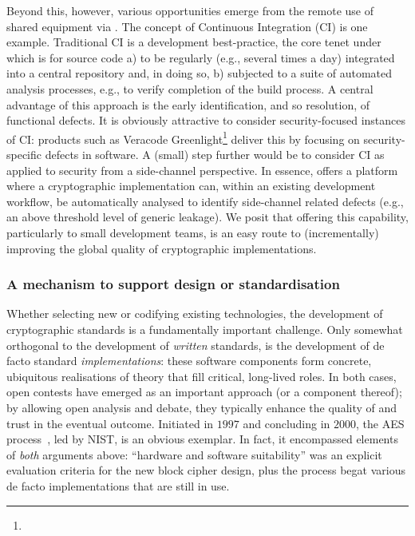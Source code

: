 Beyond this, however, various opportunities emerge from the remote use of
shared equipment via \LABID.  The concept of Continuous Integration (CI)
is one example.  Traditional CI is a development best-practice, the core 
tenet under which is for source code 
a) to be regularly (e.g., several times a day) integrated into a central repository 
   and, in doing so, 
b) subjected to a suite of automated analysis processes, e.g., to verify completion of the build process.
A central advantage of this approach is the early identification, and so
resolution, of functional defects.  
It is obviously attractive to consider security-focused instances of CI:
products such as Veracode Greenlight\footnote{
} deliver this by focusing on security-specific defects in software.  A
(small) step further would be to consider CI as applied to security from
a side-channel perspective.  In essence, \LABID offers a platform where a 
cryptographic implementation can, within an existing development workflow,
be automatically analysed to identify side-channel related defects (e.g., 
an above threshold level of generic leakage).
We posit that offering this capability, particularly to small development
teams, is an easy route to (incrementally) improving the global quality 
of cryptographic implementations.


\subsubsection{A mechanism to support design or standardisation}

Whether selecting new or codifying existing technologies, the development
of cryptographic standards is a fundamentally important challenge.  Only 
somewhat orthogonal to the development of {\em written} standards, is the 
development of de facto standard {\em implementations}: these software 
components form concrete, ubiquitous realisations of theory that fill 
critical, long-lived roles.
In both cases, open contests have emerged as an important approach (or a
component thereof); by allowing open analysis and debate, they typically 
enhance the quality of and trust in the eventual outcome.  Initiated in
$1997$ and concluding in $2000$, the AES process~\cite{SCARV:Burr:03},
led by NIST, is an obvious exemplar.  In fact, it encompassed elements of 
{\em both} arguments above: ``hardware and software suitability'' was an 
explicit evaluation criteria for the new block cipher design, plus the 
process begat various de facto implementations that are still in use.

